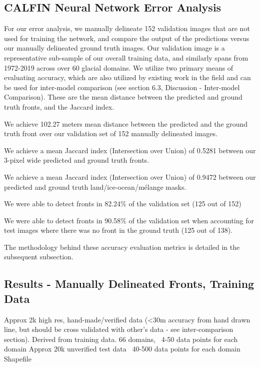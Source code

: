 \documentclass[tc, manuscript]{copernicus}
\begin{document}

\subsection{CALFIN Neural Network Error Analysis}
For our error analysis, we manually delineate 152 validation images that are not used for training the network, and compare the output of the predictions versus our manually delineated ground truth images. Our validation image is a representative sub-sample of our overall training data, and similarly spans from 1972-2019 across over 60 glacial domains. We utilize two primary means of evaluating accuracy, which are also utilized by existing work in the field \citep{mohajerani2019} \citep{zhang2019} \citep{baumhoer2019} and can be used for inter-model comparison (see section 6.3, Discussion - Inter-model Comparison). These are the mean distance between the predicted and ground truth fronts, and the Jaccard index.

We achieve 102.27 meters mean distance between the predicted and the ground truth front over our validation set of 152 manually delineated images. 

We achieve a mean Jaccard index (Intersection over Union) of 0.5281 between our 3-pixel wide predicted and ground truth fronts.

We achieve a mean Jaccard index (Intersection over Union) of 0.9472 between our  predicted and ground truth land/ice-ocean/mélange masks.

We were able to detect fronts in 82.24\% of the validation set (125 out of 152)

We were able to detect fronts in 90.58\% of the validation set when accounting for test images where there was no front in the ground truth (125 out of 138).

The methodology behind these accuracy evaluation metrics is detailed in the subsequent subsection.

\subsection{Results - Manually Delineated Fronts, Training Data}


Approx 2k high res, hand-made/verified data (<30m accuracy from hand drawn line, but should be cross validated with other's data - see inter-comparison section). Derived from training data. 66 domains, ~4-50 data points for each domain
Approx 20k unverified test data ~40-500 data points for each domain
Shapefile
\end{document}

